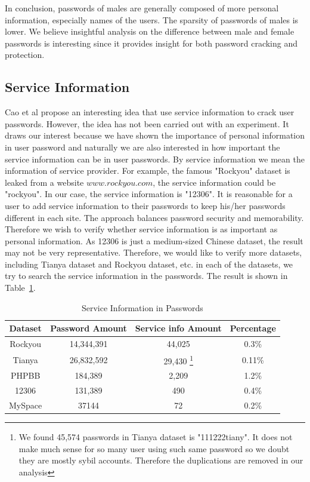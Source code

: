 \documentclass{sig-alternate}
\begin{document}
In conclusion, passwords of males are generally composed of more personal information, especially names of the users. The sparsity of passwords of males is lower. We believe insightful analysis on the difference between male and female passwords is interesting since it provides insight for both password cracking and protection. 


\subsection{Service Information} 
Cao et al \cite{cao2014personalized} propose an interesting idea that use service information to crack user passwords. However, the idea has not been carried out with an experiment. It draws our interest because we have shown the importance of personal information in user password and naturally we are also interested in how important the service information can be in user passwords. By service information we mean the information of service provider. For example, the famous "Rockyou" dataset is leaked from a website $www.rockyou.com$, the service information could be "rockyou". In our case, the service information is "12306". It is reasonable for a user to add service information to their passwords to keep his/her passwords different in each site. The approach balances password security and memorability. Therefore we wish to verify whether service information is as important as personal information. As 12306 is just a medium-sized Chinese dataset, the result may not be very representative. Therefore, we would like to verify more datasets, including Tianya dataset and Rockyou dataset, etc. in each of the datasets, we try to search the service information in the passwords. The result is shown in Table~\ref{t7}.

\begin{table}[!]
\centering
\caption{Service Information in Passwords}
\begin{adjustbox}{max width=0.48\textwidth}
\begin{tabular}{|c|c|c|c|} \hline
Dataset & Password Amount & Service info Amount & Percentage\\ \hline
Rockyou & 14,344,391 & 44,025 & 0.3\%\\ 
Tianya & 26,832,592 & 29,430{ \footnote{We found 45,574 passwords in Tianya dataset is "111222tiany". It does not make much sense for so many user using such same password so we doubt they are mostly sybil accounts. Therefore the duplications are removed in our analysis} } &0.11\%\\ 
PHPBB & 184,389 & 2,209 & 1.2\%\\ 
12306 & 131,389 & 490 & 0.4\%\\ 
MySpace & 37144 & 72 & 0.2\%\\ 
\hline\end{tabular}
\end{adjustbox}
\label{t7}
\end{table}
\end{document}
